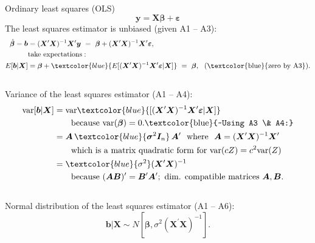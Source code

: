 \documentclass{beamer}
\begin{document}
\begin{frame}{Ordinary least squares (OLS)}
\small
\vspace{-0.3cm}
$$
\bm{y} = \bm{X\beta} + \bm{\varepsilon}
$$
\medskip
The least squares estimator is unbiased (given A1 -- A3):
\begin{align*}
    \hat{\bm{\beta}}=\bm{b}&=(\bm{X}^{\prime}\bm{X})^{-1} \bm{X}^{\prime}\bm{y}~=~\bm{\beta}+(\bm{X}^{\prime}\bm{X})^{-1} \bm{X}^{\prime}\bm{\varepsilon}, \\
    &\textnormal{take expectations}:\\
    E[\bm{b}|\bm{X}]&= \bm{\beta}+\textcolor{blue}{E[(\bm{X}^{\prime}\bm{X})^{-1} \bm{X}^{\prime}\bm{\varepsilon}|\bm{X}]}~=~\bm{\beta}, ~~(\textnormal{\textcolor{blue}{zero by A3}}).
\end{align*}\\
Variance of the least squares estimator (A1 -- A4):
\begin{align*}
    \textnormal{var}[\bm{b}|\bm{X}]&=\textnormal{var}\textcolor{blue}{[(\bm{X}^{\prime}\bm{X})^{-1} \bm{X}^{\prime}\bm{\varepsilon}|\bm{X}]}\\
    & \qquad \textnormal{because }  \textnormal{var}(\bm{\beta})=0. \textnormal{\textcolor{blue}{~Using A3 \& A4:}}  \\
    &=\bm{A}\, \textcolor{blue}{\bm{\sigma}^{2}\bm{I}_n}\,\bm{A}^{\prime} \textnormal{~~where~~}\bm{A}=(\bm{X}^{\prime}\bm{X})^{-1} \bm{X}^{\prime}\\
    & \qquad \textnormal{which is a matrix quadratic form for var}(cZ)= c^2\textnormal{var}(Z) \\
    &= \textcolor{blue}{\sigma^2} (\bm{X}^{\prime}\bm{X})^{-1} \\
    & \qquad\textnormal{because } (\bm{AB})^{\prime}=\bm{B}^{\prime}\bm{A}^{\prime}; \textnormal{~dim. compatible matrices } \bm{A}, \bm{B}.\\
\end{align*}\\
\vspace{-0.5cm}
Normal distribution of the least squares estimator (A1 -- A6):
$$\bm{b} | \bm{X} \sim N[\bm{\beta}, \sigma^2(\bm{X}^{\prime}\bm{X})^{-1}].$$
\end{frame}
\end{document}
